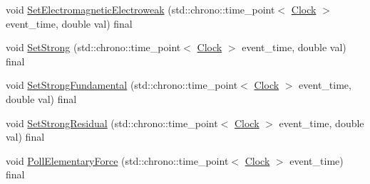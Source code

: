 \begin{DoxyCompactItemize}
\item 
void \mbox{\hyperlink{classCognitiveNetwork_a270f6842ec14b3e5b80dedf7b48ea6f4}{Set\+Electromagnetic\+Electroweak}} (std\+::chrono\+::time\+\_\+point$<$ \mbox{\hyperlink{universe_8h_a0ef8d951d1ca5ab3cfaf7ab4c7a6fd80}{Clock}} $>$ event\+\_\+time, double val) final
\item 
void \mbox{\hyperlink{classCognitiveNetwork_a50f2a12c9873e623d6247318b041ba30}{Set\+Strong}} (std\+::chrono\+::time\+\_\+point$<$ \mbox{\hyperlink{universe_8h_a0ef8d951d1ca5ab3cfaf7ab4c7a6fd80}{Clock}} $>$ event\+\_\+time, double val) final
\item 
void \mbox{\hyperlink{classCognitiveNetwork_ac54286eea279f5caa98b642b9084fd55}{Set\+Strong\+Fundamental}} (std\+::chrono\+::time\+\_\+point$<$ \mbox{\hyperlink{universe_8h_a0ef8d951d1ca5ab3cfaf7ab4c7a6fd80}{Clock}} $>$ event\+\_\+time, double val) final
\item 
void \mbox{\hyperlink{classCognitiveNetwork_a6f7210dd8c2786518329faa61b6e14d5}{Set\+Strong\+Residual}} (std\+::chrono\+::time\+\_\+point$<$ \mbox{\hyperlink{universe_8h_a0ef8d951d1ca5ab3cfaf7ab4c7a6fd80}{Clock}} $>$ event\+\_\+time, double val) final
\item 
void \mbox{\hyperlink{classCognitiveNetwork_ac97c08a0af7dc0d02fbe059827b6be87}{Poll\+Elementary\+Force}} (std\+::chrono\+::time\+\_\+point$<$ \mbox{\hyperlink{universe_8h_a0ef8d951d1ca5ab3cfaf7ab4c7a6fd80}{Clock}} $>$ event\+\_\+time) final
\end{DoxyCompactItemize}
